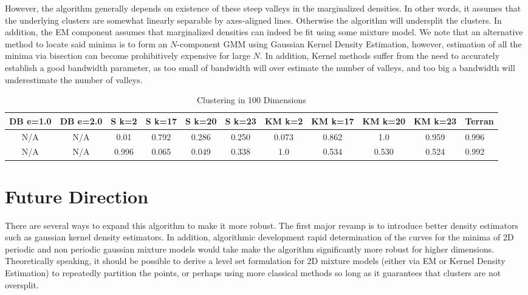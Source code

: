 \documentclass{acm_proc_article-sp}
\begin{document}
However, the algorithm generally depends on existence of these steep valleys in the marginalized densities. In other words, it assumes that the underlying clusters are somewhat linearly separable by axes-aligned lines. Otherwise the algorithm will undersplit the clusters. In addition, the EM component assumes that marginalized densities can indeed be fit using some mixture model. We note that an alternative method to locate said minima is to form an $N$-component GMM using Gaussian Kernel Density Estimation, however, estimation of all the minima via bisection can become prohibitively expensive for large $N$. In addition, Kernel methods suffer from the need to accurately establish a good bandwidth parameter, as too small of bandwidth will over estimate the number of valleys, and too big a bandwidth will underestimate the number of valleys. 

\begin{table*}
\centering
\caption{Clustering in 100 Dimensions}
\begin{tabular}{|c|c|c|c|c|c|c|c|c|c|l|} \hline
DB e=1.0 & DB e=2.0 & S k=2 & S k=17 & S k=20 & S k=23 & KM k=2 & KM k=17 & KM k=20 & KM k=23 & Terran \\ \hline
N/A & N/A & 0.01 & 0.792 & 0.286 & 0.250 & 0.073 & 0.862 & 1.0 & 0.959 & 0.996\\ \hline
N/A & N/A & 0.996 & 0.065 & 0.049 & 0.338 & 1.0 & 0.534 & 0.530 & 0.524 & 0.992\\ \hline \end{tabular}
\end{table*}

\section{Future Direction}

There are several ways to expand this algorithm to make it more robust. The first major revamp is to introduce better density estimators such as gaussian kernel density estimators. In addition, algorithmic development rapid determination of the curves for the minima of 2D periodic and non periodic gaussian mixture models would take make the algorithm significantly more robust for higher dimensions. Theoretically speaking, it should be possible to derive a level set formulation for 2D mixture models (either via EM or Kernel Density Estimation) to repeatedly partition the points, or perhaps using more classical methods so long as it guarantees that clusters are not oversplit. 
\end{document}
